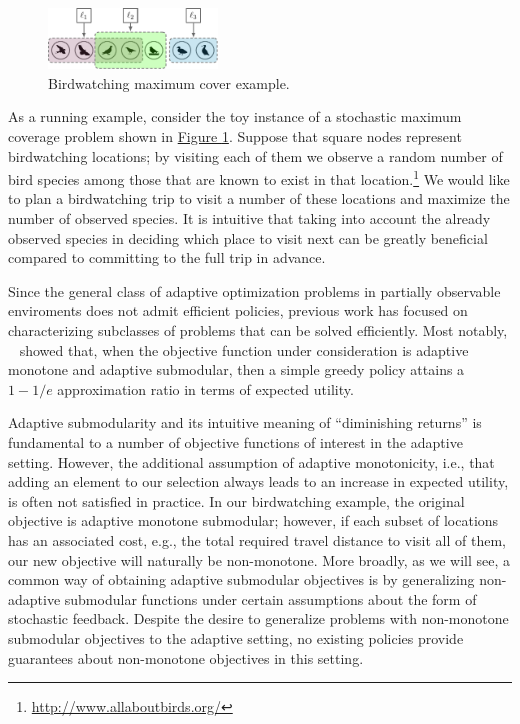 \documentclass{article}
\newcommand{\figref}[1]{\hyperref[#1]{Figure \ref*{#1}}}
\newcommand{\citet}[1]{\citeauthor{#1}~\shortcite{#1}}
\begin{document}
\begin{figure}[tb]
  \centering
  \includegraphics[width=0.4\textwidth]{figures/birdwatching.pdf}
  \caption{Birdwatching maximum cover example.}\label{fig:toy}
\end{figure}

As a running example, consider the toy instance of a stochastic maximum coverage problem shown in \figref{fig:toy}.
Suppose that square nodes represent birdwatching locations; by visiting each of them we observe a random number of bird species among those that are known to exist in that location.\footnote{\url{http://www.allaboutbirds.org/}}
We would like to plan a birdwatching trip to visit a number of these locations and maximize the number of observed species.
It is intuitive that taking into account the already observed species in deciding which place to visit next can be greatly beneficial compared to committing to the full trip in advance.

Since the general class of adaptive optimization problems in partially observable enviroments does not admit efficient policies, previous work has focused on characterizing subclasses of problems that can be solved efficiently.
Most notably, \citet{golovin11} showed that, when the objective function under consideration is adaptive monotone and adaptive submodular, then a simple greedy policy attains a $1-1/e$ approximation ratio in terms of expected utility.

Adaptive submodularity and its intuitive meaning of ``diminishing returns'' is fundamental to a number of objective functions of interest in the adaptive setting.
However, the additional assumption of adaptive monotonicity, i.e., that adding an element to our selection always leads to an increase in expected utility, is often not satisfied in practice.
In our birdwatching example, the original objective is adaptive monotone submodular; however, if each subset of locations has an associated cost, e.g., the total required travel distance to visit all of them, our new objective will naturally be non-monotone.
More broadly, as we will see, a common way of obtaining adaptive submodular objectives is by generalizing non-adaptive submodular functions under certain assumptions about the form of stochastic feedback.
Despite the desire to generalize problems with non-monotone submodular objectives to the adaptive setting, no existing policies provide guarantees about non-monotone objectives in this setting.
\end{document}
